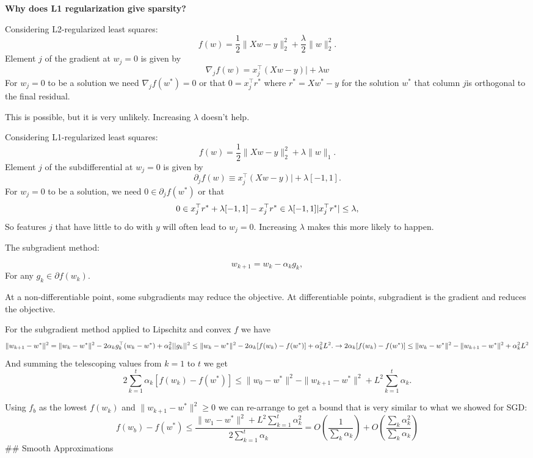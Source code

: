 \documentclass[
]{article}
\begin{document}
\textbf{Why does L1 regularization give sparsity?}

Considering L2-regularized least squares:
\[
f(w) = \frac{1}{2} \| Xw - y \|_2^2 + \frac{\lambda}{2} \| w \|_2^2.
\]
Element \(j\) of the gradient at \(w_j = 0\) is given by
\[
\nabla_j f(w) = x_j^\top (Xw - y) \big| + \lambda w
\]
For \(w_j = 0\) to be a solution we need \(\nabla_j f(w^*) = 0\) or that \(0 = x_j^\top r^*\)
where \(r^* = Xw^* - y\) for the solution \(w^*\) that column \(j\)is orthogonal to the final residual.

This is possible, but it is very unlikely. Increasing \(\lambda\) doesn't help.

Considering L1-regularized least squares:
\[
f(w) = \frac{1}{2} \| Xw - y \|_2^2 + \lambda \| w \|_1.
\]
Element \(j\) of the subdifferential at \(w_j = 0\) is given by
\[
\partial_j f(w) \equiv x_j^\top (Xw - y) \big| + \lambda [-1, 1] .
\]
For \(w_j = 0\) to be a solution, we need \(0 \in \partial_j f(w^*)\) or that
\[
0 \in x_j^\top r^* + \lambda [-1, 1] \\
-x_j^\top r^* \in \lambda [-1, 1] \\
|x_j^\top r^*| \leq \lambda,
\]
So features \(j\) that have little to do with \(y\) will often lead to \(w_j = 0\). Increasing \(\lambda\) makes this more likely to happen.

The subgradient method:

\[
w_{k+1} = w_k - \alpha_k g_k,
\]
For any \(g_k \in \partial f(w_k)\).

At a non-differentiable point, some subgradients may reduce the objective. At differentiable points, subgradient is the gradient and reduces the objective.

For the subgradient method applied to Lipschitz and convex \(f\) we have
\[
\|w_{k+1} - w^*\|^2 = \|w_k - w^*\|^2 - 2\alpha_k g_k^\top (w_k - w^*) + \alpha_k^2 ||g_k||^2\\
\leq \|w_k - w^*\|^2 - 2\alpha_k[f(w_k) - f(w^*)] + \alpha_k^2 L^2.\\\\
\rightarrow 2\alpha_k[f(w_k) - f(w^*)] \leq \|w_k - w^*\|^2 - \|w_{k+1} - w^*\|^2 + \alpha_k^2 L^2
\]
And summing the telescoping values from \(k = 1\) to \(t\) we get
\[
2 \sum_{k=1}^t \alpha_k[f(w_k) - f(w^*)] \leq \|w_0 - w^*\|^2 - \|w_{k+1} - w^*\|^2 + L^2 \sum_{k=1}^t \alpha_k.
\]

Using \(f_b\) as the lowest \(f(w_k)\) and \(\|w_{k+1} - w^*\|^2 \geq 0\) we can re-arrange to get a bound that is very similar to what we showed for SGD:
\[
f(w_b) - f(w^*) \leq \frac{\|w_1 - w^*\|^2 + L^2 \sum_{k=1}^t \alpha_k^2}{2 \sum_{k=1}^t \alpha_k}
= O \left( \frac{1}{\sum_{k} \alpha_k} \right) + O \left( \frac{\sum_{k} \alpha_k^2}{\sum_{k} \alpha_k} \right)
\]
\#\# Smooth Approximations
\end{document}
